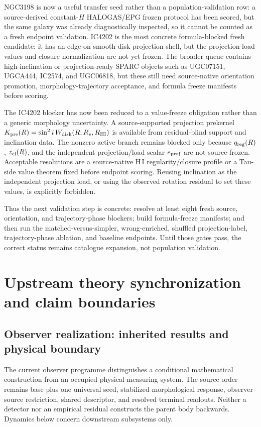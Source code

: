 \documentclass[11pt]{article}
\begin{document}
NGC3198 is now a useful transfer seed rather than a population-validation row:
a source-derived constant-\(H\) HALOGAS/EPG frozen protocol has been scored, but
the same galaxy was already diagnostically inspected, so it cannot be counted as
a fresh endpoint validation.  IC4202 is the most concrete formula-blocked fresh
candidate: it has an edge-on smooth-disk projection shell, but the
projection-load values and closure normalization are not yet frozen.  The
broader queue contains high-inclination or projection-ready SPARC objects such
as UGC07151, UGCA444, IC2574, and UGC06818, but these still need
source-native orientation promotion, morphology-trajectory acceptance, and
formula freeze manifests before scoring.

The IC4202 blocker has now been reduced to a value-freeze obligation rather
than a generic morphology uncertainty.  A source-supported projection prekernel
\(K_{\rm pre}(R)=\sin^2 i\,W_{\rm disk}(R;R_s,R_{\rm HI})\) is available from
residual-blind support and inclination data.  The nonzero active branch remains
blocked only because \(q_{\rm reg}(R)\), \(z_{\rm cl}(R)\), and the independent
projection/load scalar \(e_{\rm proj}\) are not source-frozen.  Acceptable
resolutions are a source-native H\,I regularity/closure profile or a
Tau-side value theorem fixed before endpoint scoring.  Reusing inclination as
the independent projection load, or using the observed rotation residual to set
these values, is explicitly forbidden.

Thus the next validation step is concrete: resolve at least eight fresh source,
orientation, and trajectory-phase blockers; build formula-freeze manifests; and
then run the matched-versus-simpler, wrong-enriched, shuffled projection-label,
trajectory-phase ablation, and baseline endpoints.  Until those gates pass, the
correct status remains catalogue expansion, not population validation.

\section{Upstream theory synchronization and claim boundaries}
\label{sec:observer-update-20260914}

\subsection{Observer realization: inherited results and physical boundary}
The current observer programme distinguishes a conditional mathematical
construction from an occupied physical measuring system. The source order
remains base plus one universal seed, stabilized morphological response,
observer--source restriction, shared descriptor, and resolved terminal
readouts. Neither a detector nor an empirical residual constructs the parent
body backwards. Dynamics below concern downstream subsystems only.
\end{document}
